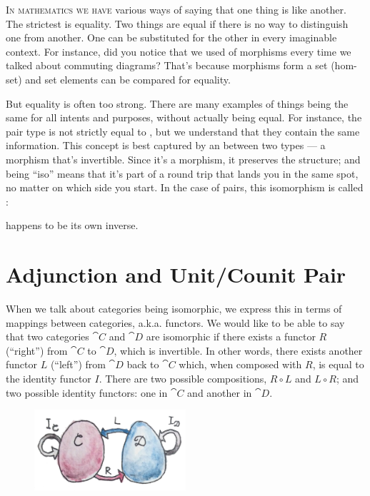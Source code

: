 
\lettrine[lhang=0.17]{I}{n mathematics we have} various ways of saying that one thing is like
another. The strictest is equality. Two things are equal if there is no
way to distinguish one from another. One can be substituted for the
other in every imaginable context. For instance, did you notice that we
used  of morphisms every time we talked about commuting
diagrams? That's because morphisms form a set (hom-set) and set elements
can be compared for equality.

But equality is often too strong. There are many examples of things
being the same for all intents and purposes, without actually being
equal. For instance, the pair type  is not
strictly equal to , but we understand that they
contain the same information. This concept is best captured by an
 between two types --- a morphism that's invertible.
Since it's a morphism, it preserves the structure; and being ``iso''
means that it's part of a round trip that lands you in the same spot, no
matter on which side you start. In the case of pairs, this isomorphism
is called :

 happens to be its own inverse.

\section{Adjunction and Unit/Counit Pair}

When we talk about categories being isomorphic, we express this in terms
of mappings between categories, a.k.a. functors. We would like to be
able to say that two categories $\cat{C}$ and $\cat{D}$ are isomorphic if
there exists a functor $R$ (``right'') from $\cat{C}$ to $\cat{D}$,
which is invertible. In other words, there exists another functor
$L$ (``left'') from $\cat{D}$ back to $\cat{C}$ which, when
composed with $R$, is equal to the identity functor $I$.
There are two possible compositions, $R \circ L$ and
$L \circ R$; and two possible identity functors: one in $\cat{C}$
and another in $\cat{D}$.

\begin{figure}[H]
\centering
\includegraphics[width=0.5\textwidth]{images/adj-1.jpg}
\end{figure}

